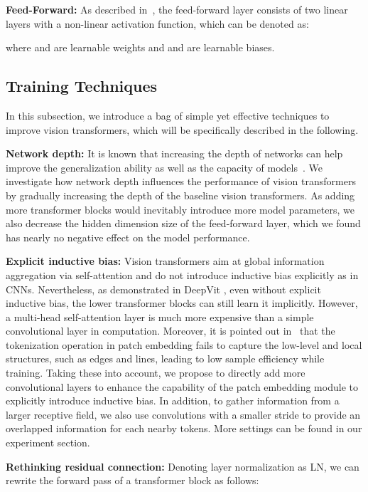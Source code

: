 \documentclass[10pt,twocolumn,letterpaper]{article}
\newcommand{\myPara}[1]{\vspace{.05in}\noindent\textbf{#1:}}
\begin{document}
\myPara{Feed-Forward} As described in~\cite{vaswani2017attention}, the feed-forward layer consists of two linear layers with a non-linear activation function, which can be denoted as:

where  and  are learnable weights and  and  are learnable biases.

\subsection{Training Techniques} \label{sec:train_techniques}

In this subsection, we introduce a bag of simple yet effective techniques to 
improve vision transformers, which will be specifically described in the following. 

\myPara{Network depth}
It is known that increasing the depth of networks can help improve the generalization ability 
as well as the capacity of models~\cite{he2016deep,tan2019efficientnet}. 
We investigate how network depth influences the performance of vision transformers 
by gradually increasing the depth of the baseline vision transformers.
As adding more transformer blocks would inevitably introduce more model parameters, 
we also decrease the hidden dimension size of the feed-forward layer, which we found
has nearly no negative effect on the model performance.

\myPara{Explicit inductive bias}
Vision transformers aim at global information aggregation via self-attention and do not
introduce inductive bias explicitly as in CNNs.
Nevertheless, as demonstrated in DeepVit \cite{zhou2021deepvit}, even without explicit
inductive bias, the lower transformer blocks can still learn it implicitly.
However, a multi-head self-attention layer is much more expensive than a simple convolutional
layer in computation.
Moreover, it is pointed out in~\cite{yuan2021tokens} that the tokenization operation in patch embedding
fails to capture the low-level and local structures, such as edges and lines, 
leading to low sample efficiency while training.
Taking these into account, we propose to directly add more convolutional layers to 
enhance the capability of the patch embedding module to explicitly introduce inductive bias.
In addition, to gather information from a larger receptive field, we also use convolutions 
with a smaller stride to provide an overlapped information for each nearby tokens.
More settings can be found in our experiment section.

\myPara{Rethinking residual connection}
Denoting layer normalization as LN, we can rewrite the forward pass of a transformer block as follows:
\end{document}
